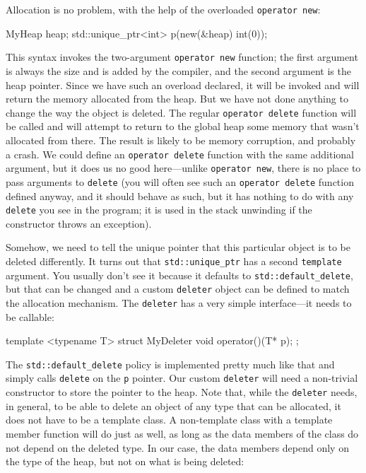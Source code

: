 Allocation is no problem, with the help of the overloaded \texttt{operator\ new}:

\begin{code}
MyHeap heap;
std::unique_ptr<int> p(new(&heap) int(0));
\end{code}

This syntax invokes the two-argument \texttt{operator\ new} function; the first argument is always the size and is added by the compiler, and the second argument is the heap pointer. Since we have such an overload declared, it will be invoked and will return the memory allocated from the heap. But we have not done anything to change the way the object is deleted. The regular \texttt{operator\ delete} function will be called and will attempt to return to the global heap some memory that wasn't allocated from there. The result is likely to be memory corruption, and probably a crash. We could define an \texttt{operator\ delete} function with the same additional argument, but it does us no good here---unlike \texttt{operator\ new}, there is no place to pass arguments to \texttt{delete} (you will often see such an \texttt{operator\ delete} function defined anyway, and it should behave as such, but it has nothing to do with any \texttt{delete} you see in the program; it is used in the stack unwinding if the constructor throws an exception).

Somehow, we need to tell the unique pointer that this particular object is to be deleted differently. It turns out that \texttt{std::unique\_ptr} has a second \texttt{template} argument. You usually don't see it because it defaults to \texttt{std::default\_delete}, but that can be changed and a custom \texttt{deleter} object can be defined to match the allocation mechanism. The \texttt{deleter} has a very simple interface---it needs to be callable:

\begin{code}
template <typename T> struct MyDeleter {
  void operator()(T* p);
};
\end{code}

The \texttt{std::default\_delete} policy is implemented pretty much like that and simply calls \texttt{delete} on the \texttt{p} pointer. Our custom \texttt{deleter} will need a non-trivial constructor to store the pointer to the heap. Note that, while the \texttt{deleter} needs, in general, to be able to delete an object of any type that can be allocated, it does not have to be a template class. A non-template class with a template member function will do just as well, as long as the data members of the class do not depend on the deleted type. In our case, the data members depend only on the type of the heap, but not on what is being deleted:

